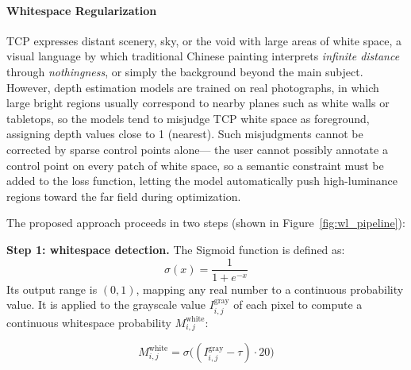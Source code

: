 \paragraph{Whitespace Regularization}

TCP expresses distant scenery, sky, or the void with large areas of white space,
a visual language by which traditional Chinese painting interprets \textit{infinite distance} through \textit{nothingness},
or simply the background beyond the main subject.
However, depth estimation models are trained on real photographs,
in which large bright regions usually correspond to nearby planes such as white walls or tabletops,
so the models tend to misjudge TCP white space as foreground, assigning depth values close to 1 (nearest).
Such misjudgments cannot be corrected by sparse control points alone---
the user cannot possibly annotate a control point on every patch of white space,
so a semantic constraint must be added to the loss function,
letting the model automatically push high-luminance regions toward the far field during optimization.

The proposed approach proceeds in two steps (shown in Figure~\ref{fig:wl_pipeline}):

\textbf{Step 1: whitespace detection.}
The Sigmoid function is defined as:
\begin{equation}
  \sigma(x) = \frac{1}{1 + e^{-x}}
\end{equation}
Its output range is $(0, 1)$, mapping any real number to a continuous probability value.
It is applied to the grayscale value $I^{\mathrm{gray}}_{i,j}$ of each pixel
to compute a continuous whitespace probability $M^{\mathrm{white}}_{i,j}$:

\begin{equation}
  M^{\mathrm{white}}_{i,j} = \sigma\!\bigl((I^{\mathrm{gray}}_{i,j} - \tau) \cdot 20\bigr)
\end{equation}

